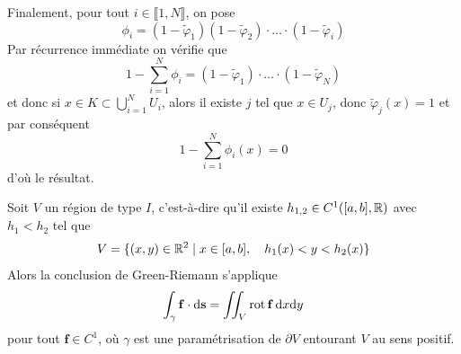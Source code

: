 {	Finalement, pour tout $i \in \llbracket1, N\rrbracket$, on pose
	\[
	\phi_i = (1 - \tilde \varphi_1)(1 - \tilde \varphi_2) \cdot \ldots \cdot (1- \tilde \varphi_i)
	\]
	Par récurrence immédiate on vérifie que 
	\[
	1 - \sum_{i=1}^N \phi_i = (1 - \tilde \varphi_1) \cdot \ldots \cdot (1 - \tilde \varphi_N)
	\]
	et donc si $x \in K \subset \bigcup_{i=1}^N U_i$, alors il existe $j$ tel que $x \in U_j$, donc $\tilde \varphi_j(x) = 1$ et par conséquent
	\[
	1 - \sum_{i=1}^N \phi_i(x) = 0
	\]
	d'où le résultat.
}


\begin{lemme} \label{lem: Green-Riemann sur des régions de type I ou II}
Soit $V$ un région de type $I$, c'est-à-dire qu'il existe $h_{1,2} \in C^1([a,b], \mathbb{R})$ avec $h_1 < h_2$ tel que
\[
V = \{ (x,y) \in \mathbb{R}^2 \mid x \in [a,b], \quad h_1(x) < y < h_2(x)\}
\]
Alors la conclusion de Green-Riemann s'applique
\[
\int_\gamma \mathbf{f} \cdot \mathrm d \mathbf{s} = \iint_V \operatorname{rot} \mathbf{f} \, \mathrm d x \mathrm dy
\]
pour tout $\bm f \in C^1$, où $\gamma$ est une paramétrisation de $\partial V$ entourant $V$ au sens positif.
\end{lemme}

